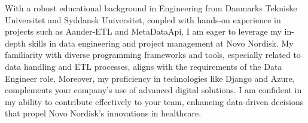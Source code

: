 
With a robust educational background in Engineering from Danmarks Tekniske Universitet and Syddansk Universitet, coupled with hands-on experience in projects such as Aander-ETL and MetaDataApi, I am eager to leverage my in-depth skills in data engineering and project management at Novo Nordisk.
 My familiarity with diverse programming frameworks and tools, especially related to data handling and ETL processes, aligns with the requirements of the Data Engineer role.
 Moreover, my proficiency in technologies like Django and Azure, complements your company’s use of advanced digital solutions.
 I am confident in my ability to contribute effectively to your team, enhancing data-driven decisions that propel Novo Nordisk's innovations in healthcare.

